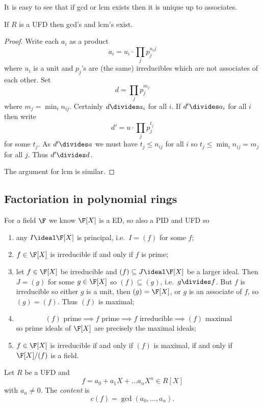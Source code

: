 \documentclass[a4paper]{article}
\theoremstyle{definition}
\begin{document}
It is easy to see that if gcd or lcm exists then it is unique up to associates.

\begin{proposition}
  If \(R\) is a UFD then gcd's and lcm's exist.
\end{proposition}

\begin{proof}
  Write each \(a_i\) as a product
  \[
    a_i = u_i \cdot \prod_j p_j^{n_ij}
  \]
  where \(u_i\) is a unit and \(p_j\)'s are (the same) irreducibles which are not associates of each other. Set
  \[
    d = \prod_j p_j^{m_j}
  \]
  where \(m_j = \min_i n_{ij}\). Certainly \(d \divides a_i\) for all \(i\). If \(d' \divides a_i\) for all \(i\) then write
  \[
    d' = u \cdot \prod_j p_j^{t_j}
  \]
  for some \(t_j\). As \(d' \divides a\) we must have \(t_j \leq n_{ij}\) for all \(i\) so \(t_j \leq \min_i n_{ij} = m_j\) for all \(j\). Thus \(d' \divides d\).

  The argument for lcm is similar.
\end{proof}

\subsection{Factoriation in polynomial rings}

For a field \(\F\) we know \(\F[X]\) is a ED, so also a PID and UFD so
\begin{enumerate}
\item any \(I \ideal \F[X]\) is principal, i.e.\ \(I = (f)\) for some \(f\);
\item \(f \in \F[X]\) is irreducible if and only if \(f\) is prime;
\item let \(f \in \F[X]\) be irreducible and \((f) \subseteq J \ideal \F[X]\) be a larger ideal. Then \(J = (g)\) for some \(g \in \F[X]\) so \((f) \subseteq (g)\), i.e.\ \(g \divides f\). But \(f\) is irreducible so either \(g\) is a unit, then \((g) = \F[X]\), or \(g\) is an associate of \(f\), so \((g) = (f)\). Thus \((f)\) is maximal;
\item
  \[(f) \text{ prime} \implies f \text{ prime} \implies f \text{ irreducible} \implies (f) \text{ maximal}
  \]
  so prime ideals of \(\F[X]\) are precisely the maximal ideals;
\item \(f \in \F[X]\) is irreducible if and only if \((f)\) is maximal, if and only if \(\F[X]/(f)\) is a field.
\end{enumerate}

\begin{definition}[Content]
  Let \(R\) be a UFD and
  \[
    f = a_0 + a_1X + \dots a_nX^n \in R[X]
  \]
  with \(a_n \neq 0\). The \emph{content} is
  \[
    c(f) = \gcd(a_0, \dots, a_n).
  \]
\end{definition}
\end{document}
